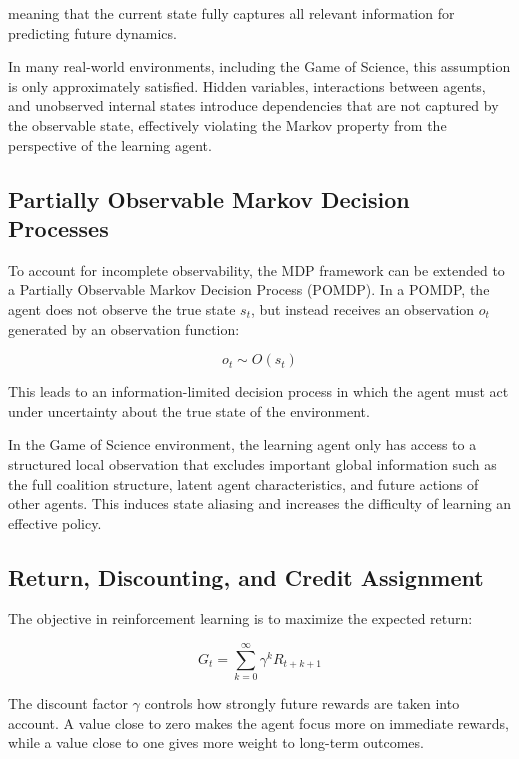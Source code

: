 \documentclass[english,bachelor]{hsluthesis}
\begin{document}
meaning that the current state fully captures all relevant information for predicting future dynamics.

In many real-world environments, including the Game of Science, this assumption is only approximately satisfied. Hidden variables, interactions between agents, and unobserved internal states introduce dependencies that are not captured by the observable state, effectively violating the Markov property from the perspective of the learning agent.

\subsection{Partially Observable Markov Decision Processes}
To account for incomplete observability, the MDP framework can be extended to a Partially Observable Markov Decision Process (POMDP). In a POMDP, the agent does not observe the true state $s_t$, but instead receives an observation $o_t$ generated by an observation function:

\begin{equation}
o_t \sim O(s_t)
\end{equation}

This leads to an information-limited decision process in which the agent must act under uncertainty about the true state of the environment.

In the Game of Science environment, the learning agent only has access to a structured local observation that excludes important global information such as the full coalition structure, latent agent characteristics, and future actions of other agents. This induces state aliasing and increases the difficulty of learning an effective policy.

\subsection{Return, Discounting, and Credit Assignment}

The objective in reinforcement learning is to maximize the expected return:

\begin{equation}
G_t = \sum_{k=0}^{\infty} \gamma^k R_{t+k+1}
\end{equation}

The discount factor $\gamma$ controls how strongly future rewards are taken into account. A value close to zero makes the agent focus more on immediate rewards, while a value close to one gives more weight to long-term outcomes.
\end{document}
